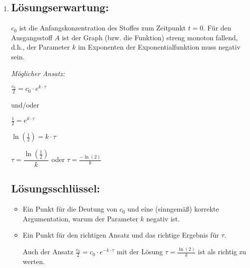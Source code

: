 \begin{langesbeispiel}
{\begin{enumerate}
	\item \subsection{Lösungserwartung:}
		$c_0$ ist die Anfangskonzentration des Stoffes zum Zeitpunkt $t=0$. Für den Ausgangsstoff $A$ ist der Graph (bzw. die Funktion) streng monoton fallend, d.h., der Parameter $k$ im Exponenten der Exponentialfunktion muss negativ sein.   
		
		\textit{Möglicher Ansatz:}
		
		$\frac{c_0}{2}=c_0\cdot e^{k\cdot\tau}$
		
		und/oder
		
		$\frac{1}{2}=e^{k\cdot\tau}$
		
		$\ln(\frac{1}{2})=k\cdot\tau$
		
		$\tau=\dfrac{\ln(\frac{1}{2})}{k}$ oder $\tau=\frac{-\ln(2)}{k}$

	\subsection{Lösungsschlüssel:}
	
\begin{itemize}
	\item  Ein Punkt für die Deutung von $c_0$ und eine (sinngemäß) korrekte Argumentation, warum der Parameter $k$ negativ ist.
	\item Ein Punkt für den richtigen Ansatz und das richtige Ergebnis für $\tau$.
	
	Auch der Ansatz $\frac{c_0}{2}=c_0\cdot e^{-k\cdot\tau}$ mit der Lösung $\tau=\frac{\ln(2)}{k}$ ist als richtig zu werten.
\end{itemize}
\end{enumerate}}
		\end{langesbeispiel}